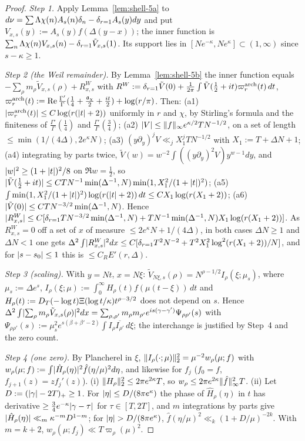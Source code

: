 \begin{proof}
\emph{Step 1.} Apply Lemma~\ref{lem:shell-5a} to $d\nu=\sum\Lam\chi(n)A_s(n)\delta_n-\delta_{r=1}A_s(y)dy$ and put $V_{x,s}(y):=A_s(y)f(\Delta(y-x))$; the inner
function is $\sum_n\Lam\chi(n)V_{x,s}(n)-\delta_{r=1}\tilde V_{x,s}(1)$. Its support lies in $[Ne^{-\kappa},Ne^\kappa]\subset(1,\infty)$ since $s-\kappa\ge1$.

\emph{Step 2 (the Weil remainder).} By Lemma~\ref{lem:shell-5b} the inner function equals $-\sum_\rho m_\rho\tilde V_{x,s}(\rho)+R^W_{x,s}$ with
$R^W:=\delta_{r=1}\tilde V(0)+\frac1{2\pi}\int\tilde V(\frac12+it)\varpi^{\rm arch}_r(t)\,dt$, $\varpi^{\rm arch}_r(t):=\Re\frac{\Gamma'}{\Gamma}(\frac14+\frac{\mathfrak a_\chi}2+\frac{it}2)+\log(r/\pi)$. Then:
(a1) $\abs{\varpi^{\rm arch}_r(t)}\le C\log(r(\abs t+2))$ uniformly in $r$ and $\chi$, by Stirling's formula and the finiteness of $\frac{\Gamma'}{\Gamma}(\frac14)$ and $\frac{\Gamma'}{\Gamma}(\frac34)$;
(a2) $\abs V\le\norm f_\infty e^{\kappa/2}TN^{-1/2}$, on a set of length $\le\min(1/(4\Delta),2e^\kappa N)$;
(a3) $(y\partial_y)^jV\ll_jX_1^jTN^{-1/2}$ with $X_1:=T+\Delta N+1$;
(a4) integrating by parts twice, $\tilde V(w)=w^{-2}\int((y\partial_y)^2V)y^{w-1}dy$, and $\abs w^2\ge(1+\abs t)^2/8$ on $\Re w=\frac12$, so
$\abs{\tilde V(\frac12+it)}\le CTN^{-1}\min(\Delta^{-1},N)\min(1,X_1^2/(1+\abs t)^2)$;
(a5) $\int\min(1,X_1^2/(1+\abs t)^2)\log(r(\abs t+2))\,dt\le CX_1\log(r(X_1+2))$;
(a6) $\abs{\tilde V(0)}\le CTN^{-3/2}\min(\Delta^{-1},N)$.
Hence $\abs{R^W_{x,s}}\le C[\delta_{r=1}TN^{-3/2}\min(\Delta^{-1},N)+TN^{-1}\min(\Delta^{-1},N)X_1\log(r(X_1+2))]$. As $R^W_{x,s}=0$ off a set of $x$ of
measure $\le2e^\kappa N+1/(4\Delta)$, in both cases $\Delta N\ge1$ and $\Delta N<1$ one gets
$\Delta^2\int\abs{R^W_{x,s}}^2dx\le C[\delta_{r=1}T^2N^{-2}+T^2X_1^2\log^2(r(X_1+2))/N]$, and for $\abs{s-s_0}\le1$ this is $\le C_RE'(r,\Delta)$.

\emph{Step 3 (scaling).} With $y=Nt$, $x=N\xi$: $\tilde V_{N\xi,s}(\rho)=N^{\rho-1/2}I_\rho(\xi;\mu_s)$, where $\mu_s:=\Delta e^s$,
$I_\rho(\xi;\mu):=\int_0^\infty H_\rho(t)f(\mu(t-\xi))\,dt$ and $H_\rho(t):=\DT(-\log t)\Xi(\log t/\kappa)t^{\rho-3/2}$ does not depend on $s$. Hence
$\Delta^2\int\abs{\sum_\rho m_\rho\tilde V_{x,s}(\rho)}^2dx=\sum_{\rho,\rho'}m_\rho m_{\rho'}e^{is(\gamma-\gamma')}\Psi_{\rho\rho'}(s)$ with
$\Psi_{\rho\rho'}(s):=\mu_s^2e^{s(\beta+\beta'-2)}\int I_\rho\overline{I_{\rho'}}\,d\xi$; the interchange is justified by Step~4 and the zero count.

\emph{Step 4 (one zero).} By Plancherel in $\xi$, $\norm{I_\rho(\cdot;\mu)}_2^2=\mu^{-2}w_\rho(\mu;f)$ with $w_\rho(\mu;f):=\int\abs{\hat H_\rho(\eta)}^2\hat f(\eta/\mu)^2d\eta$, and
likewise for $f_j$ ($f_0=f$, $f_{j+1}(z)=zf_j'(z)$). (i) $\norm{H_\rho}_2^2\le2\pi e^{2\kappa}T$, so $w_\rho\le2\pi e^{2\kappa}\norm{\hat f}_\infty^2T$. (ii) Let
$D:=(\abs\gamma-2T)_+\ge1$. For $\abs\eta\le D/(8\pi e^\kappa)$ the phase of $\hat H_\rho(\eta)$ in $t$ has derivative $\ge\frac34e^{-\kappa}\abs{\gamma-\tau}$ for
$\tau\in[T,2T]$, and $m$ integrations by parts give $\abs{\hat H_\rho(\eta)}\ll_m\kappa^{-m}D^{1-m}$; for $\abs\eta>D/(8\pi e^\kappa)$,
$\hat f(\eta/\mu)^2\ll_k(1+D/\mu)^{-2k}$. With $m=k+2$, $w_\rho(\mu;f_j)\ll T\varpi_\rho(\mu)^2$.


\end{proof}

